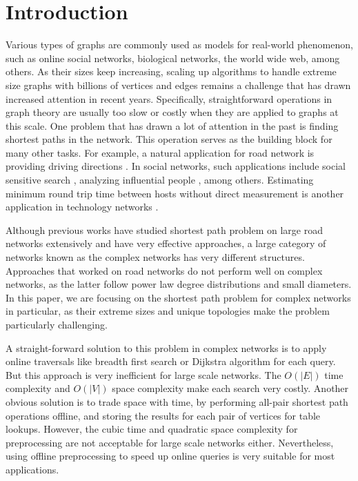 \section{Introduction}
\label{introduction}

Various types of graphs are commonly used as models for real-world phenomenon, such as online social networks, biological networks, the world wide web, among others. As their sizes keep increasing, scaling up algorithms to handle extreme size graphs with billions of vertices and edges remains a challenge that has drawn increased attention in recent years. Specifically, straightforward operations in graph theory are usually too slow or costly when they are applied to graphs at this scale. One problem that has drawn a lot of attention in the past is finding shortest paths in the network. This operation serves as the building block for many other tasks. For example, a natural application for road network is providing driving directions \cite{Abraham:2011:HLA:2008623.2008645}. In social networks, such applications include social sensitive search \cite{Vieira:2007:ESR:1321440.1321520}, analyzing influential people \cite{Kempe:2003:MSI:956750.956769}, among others. Estimating minimum round trip time between hosts without direct measurement is another application in technology networks \cite{Tang:2003:VLI:948205.948223}.

Although previous works have studied shortest path problem on large road networks extensively and have very effective approaches, a large category of networks known as the complex networks has very different structures. Approaches that worked on road networks do not perform well on complex networks, as the latter follow power law degree distributions and small diameters. In this paper, we are focusing on the shortest path problem for complex networks in particular, as their extreme sizes and unique topologies make the problem particularly challenging.

A straight-forward solution to this problem in complex networks is to apply online traversals like breadth first search or Dijkstra algorithm for each query. But this approach is very inefficient for large scale networks. The $O(|E|)$ time complexity and $O(|V|)$ space complexity make each search very costly. Another obvious solution is to trade space with time, by performing all-pair shortest path operations offline, and storing the results for each pair of vertices for table lookups. However, the cubic time and quadratic space complexity for preprocessing are not acceptable for large scale networks either. Nevertheless, using offline preprocessing to speed up online queries is very suitable for most applications.

